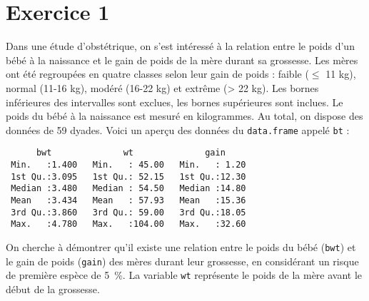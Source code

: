 \documentclass[11pt]{report}
\theoremstyle{definition}
\begin{document}
\section*{Exercice 1}
Dans une étude d'obstétrique, on s'est intéressé à la relation entre le
poids d'un bébé à la naissance et le gain de poids de la mère durant sa
grossesse. Les mères ont été regroupées en quatre classes selon leur gain de
poids : faible ($\leq$ 11 kg), normal (11-16 kg), modéré (16-22 kg) et extrême (>
22 kg). Les bornes inférieures des intervalles sont exclues, les bornes
supérieures sont inclues. Le poids du bébé à la naissance est mesuré en
kilogrammes. Au total, on dispose des données de 59 dyades. Voici un aperçu
des données du \texttt{data.frame} appelé \texttt{bt} :
\begin{verbatim}
      bwt              wt              gain      
 Min.   :1.400   Min.   : 45.00   Min.   : 1.20  
 1st Qu.:3.095   1st Qu.: 52.15   1st Qu.:12.30  
 Median :3.480   Median : 54.50   Median :14.80  
 Mean   :3.434   Mean   : 57.93   Mean   :15.36  
 3rd Qu.:3.860   3rd Qu.: 59.00   3rd Qu.:18.05  
 Max.   :4.780   Max.   :104.00   Max.   :32.60
\end{verbatim}
On cherche à démontrer qu'il existe une relation entre le poids du bébé
(\texttt{bwt}) et le gain de poids (\texttt{gain}) des mères durant
leur grossesse, en considérant un risque de première espèce de 5~\%. La
variable \texttt{wt} représente le poids de la mère avant le début de la
grossesse.  
\end{document}
